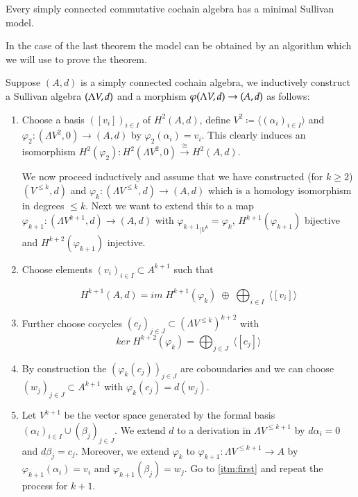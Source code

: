 \begin{Theorem}
 \label{thm:MinimalSullivanModelsExistForSimplyConnected}
 Every simply connected commutative cochain algebra has a minimal Sullivan model.
\end{Theorem}

In the case of the last theorem the model can be obtained by an algorithm which we will use to prove the theorem.

\begin{Algorithm}
\label{alg:ConstructionOfMinimalSullivanAlgebra}
 Suppose $(A,d)$ is a simply connected cochain algebra, we inductively construct a Sullivan algebra $(\Lambda V,d)$ and a morphism
 $\varphi (\Lambda V,d) \to (A,d)$ as follows:
 
 \begin{enumerate}
  \item \label{itm:FirstAlgorithmStep} Choose a basis $([v_i])_{i \in I}$ of $H^2(A,d)$, define $V^2 \coloneqq \langle (\alpha_i)_{i \in I} \rangle$ and
  $\varphi_2 \colon (\Lambda V^2,0) \to (A,d)$ by $\varphi_2(\alpha_i) = v_i$. This clearly induces an isomorphism 
  $H^2(\varphi_2) \colon H^2(\Lambda V^2, 0) \overset{\cong}{\to} H^2(A,d)$.
   
   We now proceed inductively and assume that we have constructed (for $k \geq 2$) $(V^{\leq k}, d)$ and
   ${\varphi_k \colon (\Lambda V^{\leq k}, d) \to (A,d)}$ which is a homology isomorphism in degrees $\leq k$.
   Next we want to extend this to a map $\varphi_{k+1} \colon (\Lambda V^{k+1}, d) \to (A,d)$ with 
   ${\varphi_{k+1}}_{|V^k} = \varphi_k$, $H^{k+1}(\varphi_{k+1})$ bijective and $H^{k + 2}(\varphi_{k+1})$ injective.
   
   \item \label{itm:first} Choose elements $(v_i)_{i \in I} \subset A^{k+1}$ such that
   
   $$H^{k+1}(A,d) = im \; H^{k+1}(\varphi_k) \; \oplus \; \bigoplus_{i \in I} \; \langle [v_i] \rangle $$
   
   \item \label{itm:third} Further choose cocycles $(c_j)_{j \in J} \subset (\Lambda V^{\leq k})^{k+2}$ with
   $$ ker \; H^{k+2}(\varphi_k) = \bigoplus_{j \in J} \; \langle [c_j] \rangle$$
   
   \item By construction the $(\varphi_k(c_j))_{j \in J}$ are coboundaries and we can choose 
   $(w_j)_{j \in J} \subset A^{k+1}$ with $\varphi_k (c_j) = d(w_j)$.
   \item \label{itm:second} Let 
   $V^{k+1}$ be the vector space generated by the formal basis $(\alpha_i)_{i \in I} \cup (\beta_j)_{j \in J}$. We extend $d$
   to a derivation in $\Lambda V^{\leq k+1}$ by $d \alpha_i = 0$ and $d \beta_j = c_j$. Moreover, we extend $\varphi_k$
   to $\varphi_{k+1} \colon \Lambda V^{ \leq k+1} \to A$ by $\varphi_{k+1} (\alpha_i) = v_i$ and 
   $\varphi_{k+1} (\beta_j) = w_j$. Go to \ref{itm:first} and repeat the process for $k+1$.
 \end{enumerate}

\end{Algorithm}
